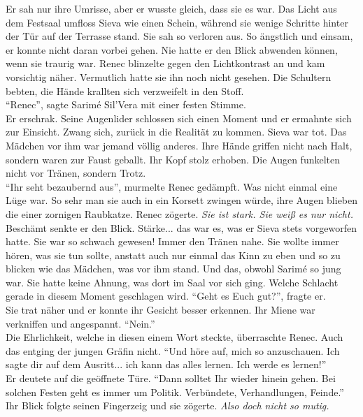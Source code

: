 Er sah nur ihre Umrisse, aber er wusste gleich, dass sie es war. Das Licht aus dem Festsaal umfloss 
Sieva wie einen Schein, während sie wenige Schritte hinter der Tür auf der Terrasse stand. Sie sah 
so verloren aus. So ängstlich und einsam, er konnte nicht daran vorbei gehen. Nie hatte er den 
Blick abwenden können, wenn sie traurig war. Renec blinzelte gegen den Lichtkontrast an und kam 
vorsichtig näher. Vermutlich hatte sie ihn noch nicht gesehen.  Die Schultern bebten, die Hände 
krallten sich verzweifelt in den Stoff. \\
``Renec'', sagte Sarimé Sil'Vera mit einer festen Stimme.\\
Er erschrak. Seine Augenlider schlossen sich einen Moment und er ermahnte sich zur Einsicht. 
Zwang sich, zurück in die Realität zu kommen. Sieva war tot. Das Mädchen vor ihm war jemand völlig 
anderes. Ihre Hände griffen nicht nach Halt, sondern waren zur Faust geballt. Ihr Kopf stolz 
erhoben. Die Augen funkelten nicht vor Tränen, sondern Trotz. \\
``Ihr seht bezaubernd aus'', murmelte Renec gedämpft. Was nicht einmal eine Lüge war. So sehr man 
sie auch in ein Korsett zwingen würde, ihre Augen blieben die einer zornigen Raubkatze. Renec 
zögerte.
\textit{Sie ist stark. Sie weiß es nur nicht.}\\
Beschämt senkte er den Blick. Stärke... das war es, was er Sieva stets vorgeworfen hatte. Sie war 
so schwach gewesen! Immer den Tränen nahe. Sie wollte immer hören, was sie tun sollte, anstatt auch 
nur einmal das Kinn zu eben und so zu blicken wie das Mädchen, was vor ihm stand. Und das, obwohl 
Sarimé so jung war. Sie hatte keine Ahnung, was dort im Saal vor sich ging. Welche Schlacht gerade 
in diesem Moment geschlagen wird. ``Geht es Euch gut?'', fragte er.\\
Sie trat näher und er konnte ihr Gesicht besser erkennen. Ihr Miene war verkniffen und angespannt.
``Nein.''\\
Die Ehrlichkeit, welche in diesen einem Wort steckte, überraschte Renec. Auch das entging der 
jungen Gräfin nicht. ``Und höre auf, mich so anzuschauen. Ich sagte dir auf dem Ausritt... ich kann 
das alles lernen. Ich werde es lernen!''\\
Er deutete auf die geöffnete Türe. ``Dann solltet Ihr wieder hinein gehen. Bei solchen Festen geht 
es immer um Politik. Verbündete, Verhandlungen, Feinde.''\\
Ihr Blick folgte seinen Fingerzeig und sie zögerte.
\textit{Also doch nicht so mutig.}\\
